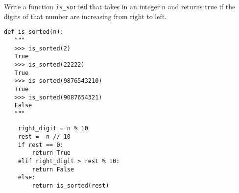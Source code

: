 \begin{blocksection}
\question Write a function \lstinline$is_sorted$ that takes in an integer
\lstinline$n$ and returns true if the digits of that number are increasing from
right to left.

\begin{lstlisting}
def is_sorted(n):
   """
   >>> is_sorted(2)
   True
   >>> is_sorted(22222)
   True
   >>> is_sorted(9876543210)
   True
   >>> is_sorted(9087654321)
   False
   """
\end{lstlisting}

\begin{solution}[1in]
\begin{lstlisting}
    right_digit = n % 10
    rest =  n // 10
    if rest == 0:
        return True
    elif right_digit > rest % 10:
        return False
    else:
        return is_sorted(rest)
\end{lstlisting}
\end{solution}
\end{blocksection}
